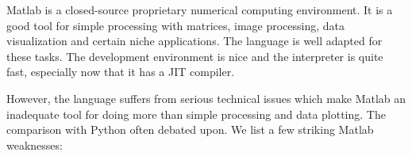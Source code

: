 

Matlab is a closed-source proprietary numerical computing environment.
%
It is a good tool for simple processing with matrices, image processing, data
visualization and certain niche applications. The language is well adapted for
these tasks. The development environment is nice and the interpreter is quite
fast, especially now that it has a JIT compiler.

However, the language suffers from serious technical issues which make Matlab
an inadequate tool
for doing more than simple processing and data plotting. The comparison with
Python often debated upon. We list a few striking Matlab weaknesses:

